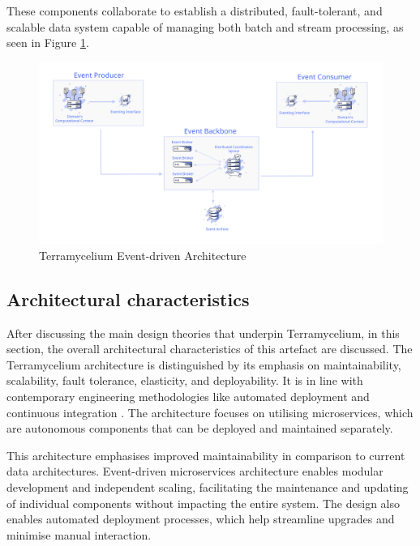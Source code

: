 \documentclass{ieeeaccess}
\begin{document}
These components collaborate to establish a distributed, fault-tolerant, and scalable data system capable of managing both batch and stream processing, as seen in Figure \ref{fig:eventDrivenArchitecture}. 

\begin{figure}[h]

  \centering

  \includegraphics[width=13cm]{images/Event-architecture.png}

  \caption{Terramycelium Event-driven Architecture}

  \label{fig:eventDrivenArchitecture}

\end{figure}

\subsection{Architectural characteristics}

After discussing the main design theories that underpin Terramycelium, in this section, the overall architectural characteristics of this artefact are discussed. The Terramycelium architecture is distinguished by its emphasis on maintainability, scalability, fault tolerance, elasticity, and deployability. It is in line with contemporary engineering methodologies like automated deployment and continuous integration \cite{Ford2021SoftwareArchitecture}. The architecture focuses on utilising microservices, which are autonomous components that can be deployed and maintained separately.

This architecture emphasises improved maintainability in comparison to current data architectures. Event-driven microservices architecture enables modular development and independent scaling, facilitating the maintenance and updating of individual components without impacting the entire system. The design also enables automated deployment processes, which help streamline upgrades and minimise manual interaction.
\end{document}
